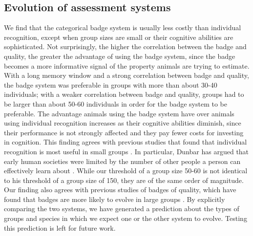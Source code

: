 \subsection*{Evolution of assessment systems} %

We find that the categorical badge system is usually less costly than individual recognition, except when group sizes are small or their cognitive abilities are sophisticated. Not surprisingly, the higher the correlation between the badge and quality, the greater the advantage of using the badge system, since the badge becomes a more informative signal of the property animals are trying to estimate. With a long memory window and a strong correlation between badge and quality, the badge system was preferable in groups with more than about 30-40 individuals; with a weaker correlation between badge and quality, groups had to be larger than about 50-60 individuals in order for the badge system to be preferable. The advantage animals using the badge system have over animals using individual recognition increases as their cognitive abilities diminish, since their performance is not strongly affected and they pay fewer costs for investing in cognition. This finding agrees with previous studies that found that individual recognition is most useful in small groups \cite{Veiga:1993fk}. In particular, Dunbar has argued that early human societies were limited by the number of other people a person can effectively learn about \cite{Dunbar:1993zr,Hill:2003ly}. While our threshold of a group size 50-60 is not identical to his threshold of a group size of 150, they are of the same order of magnitude. Our finding also agrees with previous studies of badges of quality, which have found that badges are more likely to evolve in large groups \cite{Rohwer:1975fk,Tibbetts:2009kx}. By explicitly comparing the two systems, we have generated a prediction about the types of groups and species in which we expect one or the other system to evolve. Testing this prediction is left for future work. 





